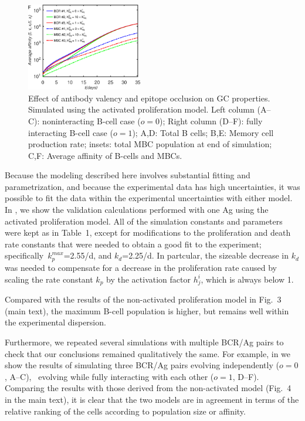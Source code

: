 \begin{figure}
\includegraphics[width=0.45\textwidth]{../figS11def/A.eps}
\caption{Effect of antibody valency and epitope occlusion on GC properties. Simulated using the activated proliferation model.
Left column (A--C): noninteracting B-cell case ($o=0$);
Right column (D--F): fully interacting B-cell case ($o=1$);
A,D: Total B cells;
B,E: Memory cell production rate; insets: total MBC population at end of simulation;
C,F: Average affinity of B-cells and MBCs.
}
\label{fig:apavidity}
\end{figure}
Because the modeling described here involves substantial fitting and
parametrization, and because the experimental data has high
uncertainties,\cite{wittenbrink11,weisel16} it was possible to fit the
data within the experimental uncertainties with either model. In , we show the validation
calculations performed with one Ag using the activated proliferation
model. All of the simulation constants and parameters were kept as in
Table~1, except for modifications to the proliferation and death
rate constants that were needed to obtain a good fit to the experiment;
specifically~$k_p^{max}$=2.55/d, and $k_d$=2.25/d.
In partcular, the sizeable decrease in $k_d$ was needed to compensate for a
decrease in the proliferation rate caused by scaling the rate constant $k_p$ by 
the activation factor $h^i_j$, which is always below 1.

Compared with the results of the non-activated proliferation model in
Fig.~3 (main text), the maximum B-cell population is higher, but
remains well within the experimental dispersion.

Furthermore, we repeated several simulations with multiple BCR/Ag
pairs to check that our conclusions remained qualitatively the same.
For example, in  we show the results of simulating three
BCR/Ag pairs evolving independently ($o=0$, A--C),
\vs~evolving while fully interacting with each other ($o=1$,
D--F). Comparing the results with those derived from the
non-activated model (Fig.~4 in the main text), it is clear that the two models 
are in agreement in terms of the relative ranking of the cells according to population size or affinity. 

